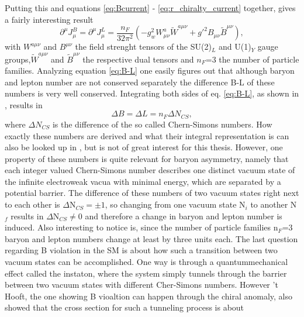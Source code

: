 Putting this and equations \eqref{eq:Bcurrent} - \eqref{eq:r_chiralty_current} together, gives a fairly interesting result
\begin{equation}
\partial^\mu J_\mu^B=\partial^\mu J_\mu^L=\frac{n_F}{32\pi^2}\left(-g_w^2W^a_{\mu\nu}\tilde{W}^{a\mu\nu}+g'^2B_{\mu\nu}\tilde{B}^{\mu\nu}\right),
\label{eq:B-L}
\end{equation}
with $W^{a\mu\nu}$ and $B^{\mu\nu}$ the field strenght tensors of the SU(2)$_L$ and U(1)$_Y$ gauge groups,$\tilde{W}^{a\mu\nu}$ and $\tilde{B}^{\mu\nu}$ the respective dual tensors and $n_F$=3 the number of particle families. \newline\indent
Analyzing equation \eqref{eq:B-L} one easily figures out that although baryon and lepton number are not conserved separately the difference B-L of these numbers is very well conserved.
Integrating both sides of eq. \eqref{eq:B-L}, as shown in \cite[pp. 15f.]{Bernreuther:2002uj}, results in 
\begin{equation}
	\Delta B=\Delta L=n_F\Delta N_{CS},
	\label{eq:number_change}
\end{equation}
where $\Delta N_{CS}$ is the difference of the so called Chern-Simons numbers. How exactly these numbers are derived and what their integral representation is can also be looked up in \cite{Bernreuther:2002uj,Cline:2006ts,Petropoulos:2003pm}, but is not of great interest for this thesis. However, one property of these numbers is quite relevant for baryon asymmetry, namely that each integer valued Chern-Simons number describes one distinct vacuum state of the infinite electroweak vacua with minimal energy, which are separated by a potential barrier. The difference of these numbers of two vacuum states right next to each other is $\Delta$N$_{CS}=\pm1$, so changing from one vacuum state N$_i$ to another N$_f$ results in $\Delta$N$_{CS}\neq0$ and therefore a change in baryon and lepton number is induced. Also interesting to notice is, since the number of particle families n$_F$=3 baryon and lepton numbers change at least by three units each. \newline\indent
The last question regarding B violation in the SM is about how such a transition between two vacuum states can be accomplished. One way is through a quantummechanical effect called the instaton, where the system simply tunnels through the barrier between two vacuum states with different Cher-Simons numbers. However 't Hooft, the one showing B vioaltion can happen through the chiral anomaly, also showed  \cite[p. 18]{Bernreuther:2002uj} that the cross section for such a tunneling process is about 
